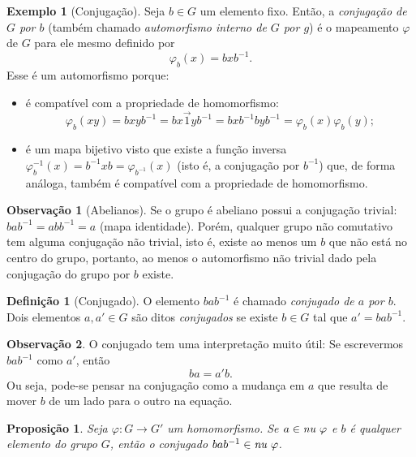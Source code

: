 \documentclass[a4paper,12pt]{report}
\newcommand{\nucleoe}{\emph{\text{nu }}}
\theoremstyle{plain}
\newtheorem{proposicao}{Proposição}[section]
\theoremstyle{definition}
\newtheorem{definicao}{Definição}[section]
\newtheorem{observacao}{Observação}[section]
\newtheorem{exemplo}{Exemplo}[section]
\begin{document}
\begin{exemplo}[Conjugação]
	 Seja \(b\in G\) um elemento fixo. Então, a
	\emph{conjugação de \(G\) por \(b\)} (também chamado \emph{automorfismo interno de $G$ por $g$}) é o mapeamento \(\varphi\) de \(G\)
	para ele mesmo definido por
	\[\varphi_b(x) = bxb^{-1}.\]
	Esse é um automorfismo porque:
	\begin{itemize}
		\item é compatível com a propriedade de homomorfismo: \[\varphi_b(xy) = bxyb^{-1} = bx\vec{1}yb^{-1} = bxb^{-1}byb^{-1} = \varphi_b(x)\varphi_b(y);\]
		\item é um mapa bijetivo visto que existe a função inversa $\varphi_b^{-1}(x) = b^{-1}xb = \varphi_{b^{-1}}(x)$ (isto é, a conjugação por \(b^{-1}\)) que, de forma análoga, também é compatível com a propriedade de homomorfismo.
	\end{itemize}
\end{exemplo}

\begin{observacao}[Abelianos]\label{ob:conjugadosDeAbelianos}
	Se o grupo é abeliano possui a conjugação trivial:
	\(bab^{ -1} = abb^{-1} = a\) (mapa identidade). Porém, qualquer grupo não comutativo tem alguma conjugação não trivial, isto é, existe ao menos um $b$ que não está no centro do grupo, portanto, ao menos o automorfismo não trivial dado pela conjugação do grupo por $b$ existe. 
\end{observacao}

\begin{definicao}[Conjugado]
	O elemento \(bab^{-1}\) é chamado \emph{conjugado de \(a\) por \(b\)}. Dois elementos \(a, a'\in G\) são ditos \emph{conjugados} se existe \(b\in G\) tal que \(a' = bab^{-1}\).	
\end{definicao}

\begin{observacao}
	O conjugado tem uma interpretação muito útil: Se escrevermos
	\(bab^{-1}\) como \(a'\), então \[ba = a'b.\] Ou seja, pode-se pensar na
	conjugação como a mudança em \(a\) que resulta de mover \(b\) de um lado
	para o outro na equação.
\end{observacao}		


\begin{proposicao}
	Seja $\varphi: G \longrightarrow G'$ um homomorfismo. Se \(a\in \nucleoe\varphi\) e \(b\) é qualquer elemento do grupo \(G\), então o conjugado \(bab^{-1} \in \nucleoe\varphi\).
\end{proposicao}
\end{document}
